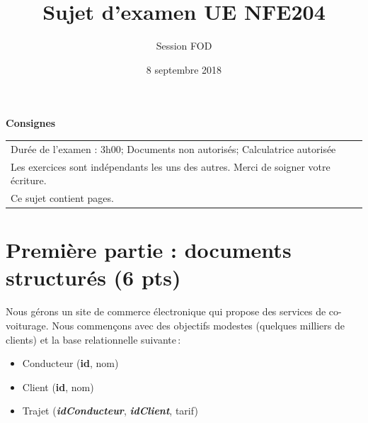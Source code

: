 \documentclass[11pt,a4paper]{article}
\begin{document}
\title{Sujet d'examen UE NFE204}
\author{Session FOD}
\date{8 septembre 2018}

\maketitle

\begin{center}
{\bf \Large Consignes}\\
\begin{tabular}{| p{15cm} |}
\hline
Dur\'ee de l'examen : 3h00; Documents non autoris\'es;  Calculatrice autoris\'ee\\

Les exercices sont indépendants les uns des autres. Merci de soigner votre écriture.\\
Ce sujet contient \pageref{LastPage} pages.\\

\hline
\end{tabular}
\end{center}




\section*{Première partie : documents structurés (6 pts)}

Nous gérons un site de commerce électronique qui propose des services de co-voiturage.
Nous commençons avec des objectifs modestes (quelques milliers de clients) et la
base relationnelle suivante\,:

\begin{itemize}
  \item Conducteur   (\textbf{id}, nom)
  \item Client (\textbf{id}, nom)
  \item Trajet (\textbf{\textit{idConducteur}}, \textbf{\textit{idClient}}, tarif)
\end{itemize}

\vspace*{0.2cm}
\end{document}
